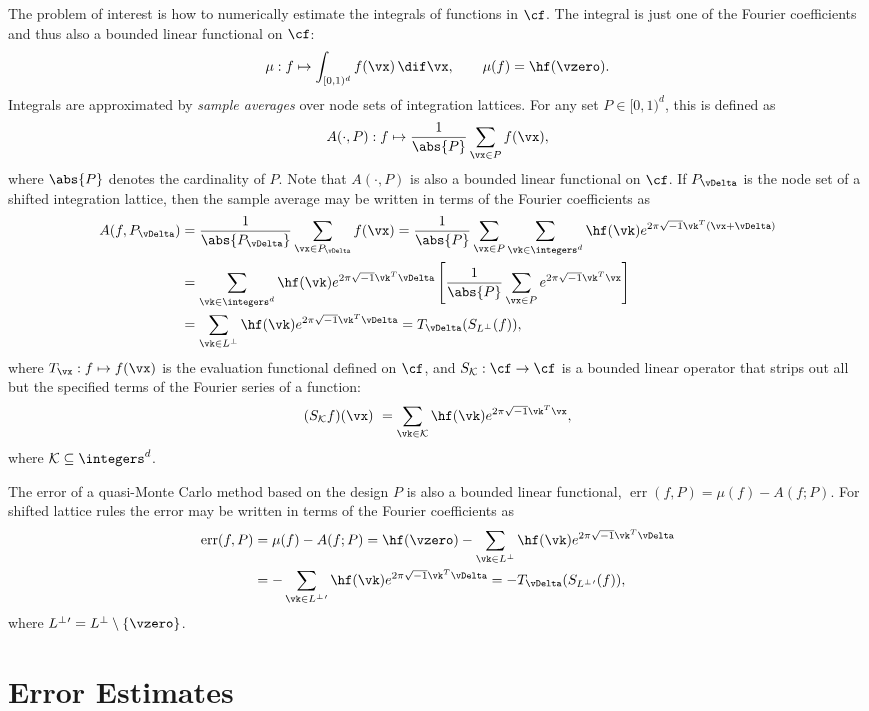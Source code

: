 \documentclass[12pt]{amsart}
\newcommand{\cubed}{[0,1)^d}
\newcommand{\ck}{\mathcal{K}}
\DeclareMathOperator{\err}{err}
\theoremstyle{definition}
\begin{document}
The problem of interest is how to numerically estimate the integrals of functions in $\cf$.  The integral is just one of the Fourier coefficients and thus also a bounded linear functional on $\cf$:
\[
\mu : f \mapsto \int_{\cubed} f(\vx) \, \dif \vx, \qquad \mu(f) = \hf(\vzero).
\]
Integrals are approximated by \emph{sample averages} over node sets of integration lattices.  For any set $P \in \cubed$, this is defined as
\[
A(\cdot,P) : f \mapsto \frac{1}{\abs{P}}\sum_{\vx \in P} f(\vx),
\]
where $\abs{P}$ denotes the cardinality of $P$. Note that $A(\cdot,P)$ is also a bounded linear functional on $\cf$. If $P_{\vDelta}$ is the node set of a shifted integration lattice, then the sample average may be written in terms of the Fourier coefficients as
\begin{align*}
A(f,P_{\vDelta}) & =  \frac{1}{\abs{P_{\vDelta}}}\sum_{\vx \in P_{\vDelta}} f(\vx)  =  \frac{1}{\abs{P}}\sum_{\vx \in P} \sum_{\vk \in \integers^d} \hf(\vk) e^{2 \pi \sqrt{-1} \vk^T (\vx+\vDelta)}\\
& =  \sum_{\vk \in \integers^d} \hf(\vk) e^{2 \pi \sqrt{-1} \vk^T \vDelta} \left[\frac{1}{\abs{P}}\sum_{\vx \in P}  e^{2 \pi \sqrt{-1} \vk^T \vx}\right] \\
& =  \sum_{\vk \in L^{\perp}} \hf(\vk) e^{2 \pi \sqrt{-1} \vk^T \vDelta}
 = T_{\vDelta}(S_{L^\perp}(f)),
\end{align*}
where $T_{\vx} : f \mapsto f(\vx)$ is the evaluation functional defined on $\cf$, and $S_{\ck}: \cf \to \cf$ is a bounded linear operator that strips out all but the specified terms of the Fourier series of a function:
\[
(S_{\ck}f)(\vx)\ = \sum_{\vk \in \ck} \hf(\vk) e^{2 \pi \sqrt{-1} \vk^T \vx},
\]
where $\ck \subseteq \integers^d$.

The error of a quasi-Monte Carlo method based on the design $P$ is also a bounded linear functional, $\err(f,P) = \mu(f) - A(f;P)$.  For shifted lattice rules the error may be written in terms of the Fourier coefficients as 
\begin{align*}
\err(f,P) &= \mu(f) - A(f;P) = \hf(\vzero) - \sum_{\vk \in L^{\perp}} \hf(\vk) e^{2 \pi \sqrt{-1} \vk^T \vDelta} \\
&= - \sum_{\vk \in L^{\perp}{}'} \hf(\vk) e^{2 \pi \sqrt{-1} \vk^T \vDelta} = - T_{\vDelta}(S_{L^{\perp}{}'}(f)),
\end{align*}
where $L^{\perp}{}' = L^\perp \setminus \{\vzero\}$.


\section{Error Estimates}
\end{document}
